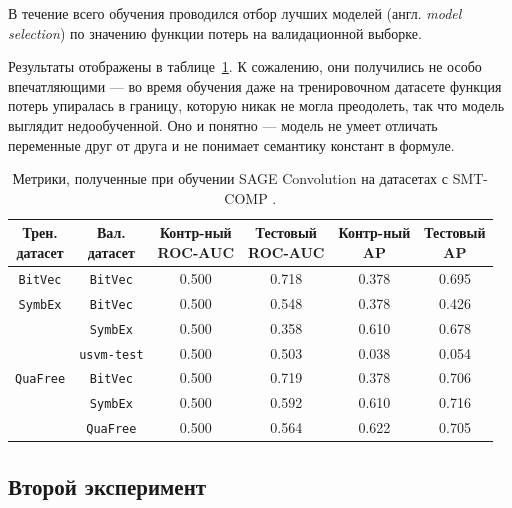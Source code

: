 В течение всего обучения проводился отбор лучших моделей (англ. \textit{model selection}) по значению функции потерь на валидационной выборке.

Результаты отображены в таблице~\ref{smt-comp-val-results}. К сожалению, они получились не особо впечатляющими --- во время обучения даже на тренировочном датасете функция потерь упиралась в границу, которую никак не могла преодолеть, так что модель выглядит недообученной. Оно и понятно --- модель не умеет отличать переменные друг от друга и не понимает семантику констант в формуле.

\begin{table}[ht]
\begin{center}
\begin{tabular}{c|c||cc|cc}
    \makecell{Трен. \\ датасет} & \makecell{Вал. \\ датасет} & \makecell{Контр-ный \\ \textsc{ROC-AUC}} & \makecell{Тестовый \\ \textsc{ROC-AUC}} & \makecell{Контр-ный \\ \textsc{AP}} & \makecell{Тестовый \\ \textsc{AP}} \\
    \hline \hline
    \rule{0pt}{2.5ex}
    \texttt{BitVec}  & \texttt{BitVec}     & 0.500 & 0.718 & 0.378 & 0.695 \\
    \hline
    \texttt{SymbEx}  & \texttt{BitVec}     & 0.500 & 0.548 & 0.378 & 0.426 \\
                     & \texttt{SymbEx}     & 0.500 & 0.358 & 0.610 & 0.678 \\
                     & \texttt{usvm-test}  & 0.500 & 0.503 & 0.038 & 0.054 \\
    \hline
    \texttt{QuaFree} & \texttt{BitVec}     & 0.500 & 0.719 & 0.378 & 0.706 \\
                     & \texttt{SymbEx}     & 0.500 & 0.592 & 0.610 & 0.716 \\
                     & \texttt{QuaFree}    & 0.500 & 0.564 & 0.622 & 0.705 \\
\end{tabular}
\caption{\label{smt-comp-val-results} Метрики, полученные при обучении SAGE Convolution на датасетах с SMT-COMP \cite{smt-comp-2023-benchmarks}.}
\end{center}
\end{table}

\subsection{Второй эксперимент}

